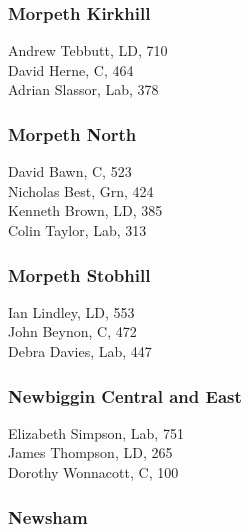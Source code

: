 \documentclass[a4paper,openany,10pt]{book}
\begin{document}
\subsubsection*{Morpeth Kirkhill}



Andrew Tebbutt, LD, 710\\
David Herne, C, 464\\
Adrian Slassor, Lab, 378\\


\subsubsection*{Morpeth North}



David Bawn, C, 523\\
Nicholas Best, Grn, 424\\
Kenneth Brown, LD, 385\\
Colin Taylor, Lab, 313\\


\subsubsection*{Morpeth Stobhill}



Ian Lindley, LD, 553\\
John Beynon, C, 472\\
Debra Davies, Lab, 447\\


\subsubsection*{Newbiggin Central and East}



Elizabeth Simpson, Lab, 751\\
James Thompson, LD, 265\\
Dorothy Wonnacott, C, 100\\


\subsubsection*{Newsham}
\end{document}
